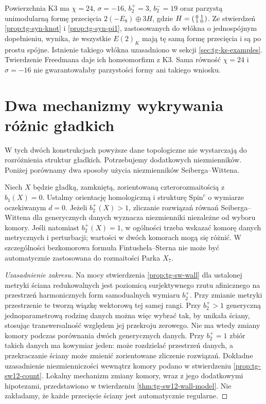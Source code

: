\begin{przyklad}
Powierzchnia K3 ma $\chi=24$, $\sigma=-16$,
$b_2^+=3$, $b_2^-=19$ oraz parzystą unimodularną
formę przecięcia $2(-E_8)\oplus3H$, gdzie
$H=\begin{psmallmatrix}0&1\\1&0\end{psmallmatrix}$.
Ze stwierdzeń \ref{prop:tg-syn-knot}
i \ref{prop:tg-syn-pi1}, zastosowanych do włókna
o jednospójnym dopełnieniu, wynika, że wszystkie
$E(2)_K$ mają tę samą formę przecięcia i są
po prostu spójne. Istnienie takiego włókna
uzasadniono w sekcji \ref{sec:tg-ks-examples}.
Twierdzenie Freedmana daje ich homeomorfizm z K3.
Sama równość $\chi=24$ i $\sigma=-16$ nie gwarantowałaby
parzystości formy ani takiego wniosku.
\end{przyklad}

\section{Dwa mechanizmy wykrywania różnic gładkich}
\label{sec:tg-syn-sw}

W tych dwóch konstrukcjach powyższe dane topologiczne
nie wystarczają do rozróżnienia struktur gładkich.
Potrzebujemy dodatkowych niezmienników.
Poniżej porównamy dwa sposoby użycia niezmienników
Seiberga--Wittena.

\begin{stwierdzenie}
\label{prop:tg-syn-regimes}
Niech $X$ będzie gładką, zamkniętą, zorientowaną
czterorozmaitością z $b_1(X)=0$.
Ustalmy orientację homologiczną i strukturę
$\mathrm{Spin}^c$ o wymiarze oczekiwanym $d=0$.
Jeżeli $b_2^+(X)>1$, zliczanie rozwiązań równań
Seiberga--Wittena dla generycznych danych wyznacza
niezmienniki niezależne od wyboru komory. Jeśli natomiast
$b_2^+(X)=1$, w ogólności trzeba wskazać komorę
danych metrycznych i perturbacji; wartości w dwóch
komorach mogą się różnić. W szczególności bezkomorowa
formuła Fintushela--Sterna nie może być automatycznie
zastosowana do rozmaitości Parka $X_7$.
\end{stwierdzenie}

\begin{proof}[Uzasadnienie zakresu]
Na mocy stwierdzenia \ref{prop:tg-sw-wall}
dla ustalonej metryki ściana redukowalnych jest
poziomicą surjektywnego rzutu afinicznego na przestrzeń
harmonicznych form samodualnych wymiaru $b_2^+$.
Przy zmianie metryki przestrzenie te tworzą
wiązkę wektorową tej samej rangi. Przy $b_2^+>1$
generyczną jednoparametrową rodzinę danych można
więc wybrać tak, by unikała ściany, stosując
transwersalność względem jej przekroju zerowego. Nie ma wtedy zmiany komory
podczas porównania dwóch generycznych danych.
Przy $b_2^+=1$ zbiór takich danych ma kowymiar jeden:
może rozdzielać przestrzeń danych, a przekraczanie ściany może
zmienić zorientowane zliczenie rozwiązań.
Dokładne uzasadnienie niezmienniczości wewnątrz
komory podano w stwierdzeniu \ref{prop:tg-sw12-count}.
Lokalny mechanizm zmiany komory, wraz z jego
dodatkowymi hipotezami, przedstawiono w twierdzeniu
\ref{thm:tg-sw12-wall-model}. Nie zakładamy, że
każde przecięcie ściany jest automatycznie regularne.
\end{proof}

